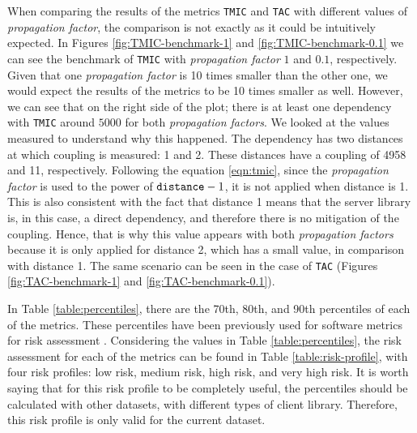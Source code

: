 When comparing the results of the metrics \texttt{TMIC} and \texttt{TAC} with different values of \textit{propagation factor}, the comparison is not exactly as it could be intuitively expected. In Figures \ref{fig:TMIC-benchmark-1} and \ref{fig:TMIC-benchmark-0.1} we can see the benchmark of \texttt{TMIC} with \textit{propagation factor} $1$ and $0.1$, respectively. Given that one \textit{propagation factor} is 10 times smaller than the other one, we would expect the results of the metrics to be 10 times smaller as well. However, we can see that on the right side of the plot; there is at least one dependency with \texttt{TMIC} around $5000$ for both \textit{propagation factors}. We looked at the values measured to understand why this happened. The dependency has two distances at which coupling is measured: 1 and 2. These distances have a coupling of 4958 and 11, respectively. Following the equation \ref{eqn:tmic}, since the \textit{propagation factor} is used to the power of $\verb|distance| - 1$, it is not applied when distance is 1. This is also consistent with the fact that distance 1 means that the server library is, in this case, a direct dependency, and therefore there is no mitigation of the coupling. Hence, that is why this value appears with both \textit{propagation factors} because it is only applied for distance 2, which has a small value, in comparison with distance 1. The same scenario can be seen in the case of \texttt{TAC} (Figures \ref{fig:TAC-benchmark-1} and \ref{fig:TAC-benchmark-0.1}).



In Table \ref{table:percentiles}, there are the 70th, 80th, and 90th percentiles of each of the metrics. These percentiles have been previously used for software metrics for risk assessment \cite{alves2010deriving}. Considering the values in Table \ref{table:percentiles}, the risk assessment for each of the metrics can be found in Table \ref{table:risk-profile}, with four risk profiles: low risk, medium risk, high risk, and very high risk. It is worth saying that for this risk profile to be completely useful, the percentiles should be calculated with other datasets, with different types of client library. Therefore, this risk profile is only valid for the current dataset.

